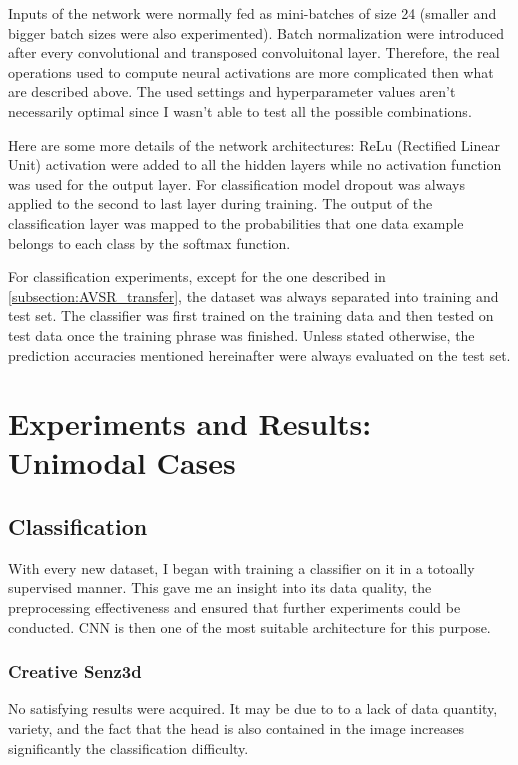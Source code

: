 Inputs of the network were normally fed as mini-batches of size 24
(smaller and bigger batch sizes were also experimented).
Batch normalization \cite{S. Ioffe 2015} were introduced after every
convolutional and transposed convoluitonal layer. Therefore, the real
operations used to compute neural activations are more complicated
then what are described above. The used settings and hyperparameter
values aren't necessarily optimal since I wasn't able to test all the
possible combinations.

Here are some more details of the network architectures: ReLu
(Rectified Linear Unit) activation were added to all the hidden layers
\cite{A. Krizhevsky 2012} while no activation function was used for
the output layer.
For classification model dropout \cite{N. Srivastava 2014}
was always applied to the second to last layer during training.
The output of the classification layer was mapped to the probabilities
that one data example belongs to each class by the softmax function.

For classification experiments, except for the one described in
\ref{subsection:AVSR_transfer}, the dataset was always separated into
training and test set. The classifier was first trained on the training data
and then tested on test data once the training phrase was finished.
Unless stated otherwise, the prediction accuracies mentioned hereinafter
were always evaluated on the test set.

\section{Experiments and Results: Unimodal Cases} \label{section:uni}

\subsection{Classification} \label{subsection:classif}

With every new dataset, I began with training a classifier on it in a
totoally supervised manner.
This gave me an insight into its data quality, the preprocessing
effectiveness and ensured that further experiments could be conducted.
CNN is then one of the most suitable architecture for this purpose.

\subsubsection{Creative Senz3d}

No satisfying results were acquired. It may be due to to a lack of data
quantity, variety, and the fact that the head is also contained in the
image increases significantly the classification difficulty.

